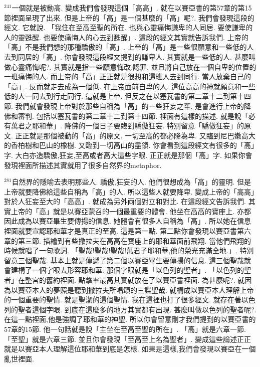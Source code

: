 \documentclass{book}
\begin{document}
$^{241}$一個就是被動高.
變成我們會發現這個「高高」.
就在以賽亞書的第57章的第15節裡面呈現了出來.
但是上帝的「高」是一個甚麼的「高」呢?.
我們會發現這段的經文.
它就說.
「我住在至高至聖的所在.
也與心靈痛悔謙卑的人同居.
要使謙卑的人的靈甦醒.
也要使痛悔人的心去到甦醒」.
這段的經文其實就告訴我們.
上帝的「高」不是我們想的那種驕傲的「高」.
上帝的「高」是一些很願意和一些低的人去到同居的「高」.
你會發現這段經文提到的謙卑人.
其實就是一些低的人.
甚麼叫做心靈痛悔呢?.
其實就是指一些願意悔改,認罪.
並且將自己放在一個自卑的位置的一班痛悔的人.
而上帝的「高」正正就是很想和這班人去到同行.
當人放棄自己的「高」.
反而就走去成為一個低.
在上帝面前自卑的人.
這位高高的神就願意和一些低的人一同去到行走同行.
這就是上帝.
但反之在以塞瓦書的第二章十二到第十四節.
我們就會發現上帝對於那些自稱為「高」的一些狂妄之輩.
是會進行上帝的降佛和審判.
包括以塞瓦書的第二章十二到第十四節.
裡面有這樣的描述.
就是說「必有萬君之耶和華」.
降佛的一個日子要臨到驕傲狂妄.
特別留意「驕傲狂妄」的原文.
正正就是那個被動的「高」的原文.
一切至高的都必降為卑.
又臨到尼巴嫩高大的香柏樹和巴山的橡樹.
又臨到一切高山的盡領.
你會看到這段經文有很多的「高」字.
大白亦造驕傲,狂妄,至高或者高大這些字眼.
正正就是那個「高」字.
如果你會發現裡面所描述其實就用了很多自然界的metaphor.

$^{281}$自然界的隱喻去表明那些人.
驕傲,狂妄的人.
他們很想成為「高」的靈明.
但是上帝就要降佛給這些自稱為「高」的人.
所以這些人就要降卑.
變成上帝的「高高」對於人狂妄至大的「高高」.
就成為另外兩個對立和對比.
在這段經文告訴我們.
其實上帝的「高」就是以賽亞蒙召的一個最重要的體會.
他坐在高高的寶座上.
亦都因此成為以賽亞畢生要傳揚的信息.
她體會有很多人自稱為「高」.
所以她在信息裡面就要宣認耶和華才是真正的至高.
這是第一點.
第二點你會發現以賽亞書第六章的第三節.
描繪到有些撒拉夫在高高在寶座上的耶和華面前飛翔.
當他們飛翔的時候就唱了一句歌詞.
「聖哉!聖哉!聖哉!萬君子耶和華,他的榮光充滿全地.」.
特別留意三個聖哉.
基本上就是傳遞了第二個以賽亞畢生要傳揚的信息.
這三個聖哉就會建構了一個字眼去形容耶和華.
那個字眼就是「以色列的聖者」.
「以色列的聖者」在整宮的舊約裡面.
點擊率最高其實就放在了以賽亞書裡面.
為甚麼呢?.
就因為以賽亞本人的夢照是聽到撒拉夫所唱頌的三諜聖哉.
就構成以賽亞本人理解上帝的一個重要的聖情.
就是聖潔的這個聖情.
我在這裡也打了很多經文.
就存在著以色列的聖者這個字眼.
到底在這麼多的地方其實都有出現.
甚麼叫做以色列的聖者呢?.
在這一點裡面,他是強調了耶和華的神聖.
所以你會留意剛才我們提到的以賽亞書的57章的15節.
他一句話就是說「主坐在至高至聖的所在」.
「高」就是六章一節.
「至聖」就是六章三節.
並且你會發現「至高至上名為聖者」.
變成這些論述正正就是以賽亞本人理解這位耶和華到底是怎樣.
如果是這樣,我們會發現以賽亞在一個亂世裡面.
\end{document}

